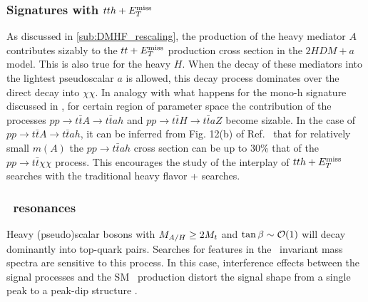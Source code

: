 \subsubsection{Signatures with $tt h+E_T^\mathrm{miss}$}

As discussed in \autoref{sub:DMHF_rescaling}, the production of the heavy mediator $A$ contributes sizably to the $tt+E_T^\mathrm{miss}$  
production cross section in the $2HDM+a$ model. 
This is also true for the heavy $H$. 
When the decay of these mediators into the lightest pseudoscalar $a$ is allowed, this decay process dominates over the direct decay into $\chi\chi$. In analogy with what happens for the mono-h signature discussed in \cite{Bauer:2017ota}, for certain region of parameter space the contribution of the processes $pp \rightarrow t\bar t A \rightarrow t \bar t a h$ and $pp \rightarrow t\bar t H \rightarrow t \bar t a Z$ become sizable. 
In the case of $pp \rightarrow t\bar t A \rightarrow t \bar t a h$, it can be inferred from Fig. 12(b) of Ref.~\cite{Bauer:2017ota} that for relatively small $m(A)$ the $pp \rightarrow t\bar t ah$ cross section can be up to 30\% that of the $pp\rightarrow t \bar t \chi\chi$ process. 
This encourages the study of the interplay of $tth+E_T^\mathrm{miss}$ searches with the traditional heavy flavor + \MET searches. 


\subsubsection{\ttbar\ resonances}

Heavy (pseudo)scalar bosons with $M_{A/H}\ge2M_{t}$ and $\tan\beta \sim \mathcal{O}(1)$ will decay dominantly into top-quark pairs. Searches for features in the \ttbar\ invariant mass spectra are sensitive to this process. 
In this case, interference effects between the signal processes and the SM \ttbar\ production distort the signal shape from a single peak to a peak-dip structure \cite{Carena:2016npr}. 

